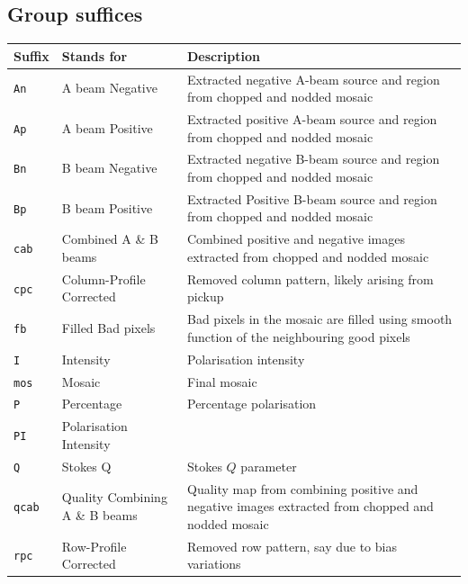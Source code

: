 \documentclass[twoside,11pt]{article}
\renewcommand{\_}{\texttt{\symbol{95}}}
\begin{document}
\subsection*{Group suffices}%
\begin{tabular}{llp{79mm}}
\hline
  Suffix   & Stands for             & Description \\ \hline
{\tt\_An}  & A beam Negative        & Extracted negative A-beam source and
                                      region from chopped and nodded mosaic \\
{\tt\_Ap}  & A beam Positive        & Extracted positive A-beam source and 
                                      region from chopped and nodded mosaic \\
{\tt\_Bn}  & B beam Negative        & Extracted negative B-beam source and
                                      region from chopped and nodded mosaic \\
{\tt\_Bp}  & B beam Positive        & Extracted Positive B-beam source and 
                                      region from chopped and nodded mosaic \\
{\tt\_cab} & Combined A \& B beams  & Combined positive and negative images
                                      extracted from chopped and nodded mosaic \\
{\tt\_cpc} & Column-Profile Corrected  & Removed column pattern, likely arising
                                      from pickup \\
{\tt\_fb}  & Filled Bad pixels      & Bad pixels in the mosaic are filled using
                                      smooth function of the neighbouring good
                                      pixels \\
{\tt\_I}   & Intensity              & Polarisation intensity \\
{\tt\_mos} & Mosaic                 & Final mosaic \\
{\tt\_P}   & Percentage             & Percentage polarisation \\
{\tt\_PI}  & Polarisation Intensity & \\
{\tt\_Q}   & Stokes Q               & Stokes $Q$ parameter \\
{\tt\_qcab} & Quality Combining A \& B beams  & Quality map from combining positive and
                                      negative images extracted from chopped and nodded mosaic \\
{\tt\_rpc} & Row-Profile Corrected  & Removed row pattern, say due to bias
                                      variations \\

\end{tabular}
\end{document}
